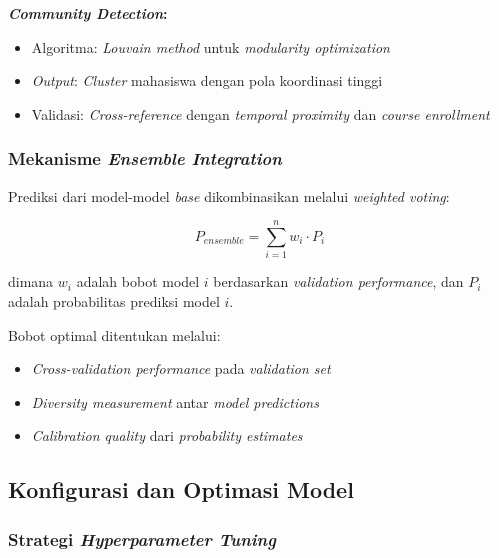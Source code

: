 \textbf{\textit{Community Detection}:}
\begin{itemize}
    \item Algoritma: \textit{Louvain method} untuk \textit{modularity optimization}
    \item \textit{Output}: \textit{Cluster} mahasiswa dengan pola koordinasi tinggi
    \item Validasi: \textit{Cross-reference} dengan \textit{temporal proximity} dan \textit{course enrollment}
\end{itemize}

\subsubsection{Mekanisme \textit{Ensemble Integration}}
\label{sec:mekanismeIntegrasi}

Prediksi dari model-model \textit{base} dikombinasikan melalui \textit{weighted voting}:

\begin{equation}
P_{ensemble} = \sum_{i=1}^{n} w_i \cdot P_i
\end{equation}

dimana $w_i$ adalah bobot model $i$ berdasarkan \textit{validation performance}, dan $P_i$ adalah probabilitas prediksi model $i$.

Bobot optimal ditentukan melalui:
\begin{itemize}
    \item \textit{Cross-validation performance} pada \textit{validation set}
    \item \textit{Diversity measurement} antar \textit{model predictions}
    \item \textit{Calibration quality} dari \textit{probability estimates}
\end{itemize}

\subsection{Konfigurasi dan Optimasi Model}
\label{subsec:konfigurasiOptimasi}

\subsubsection{Strategi \textit{Hyperparameter Tuning}}
\label{sec:hyperparameterTuning}

